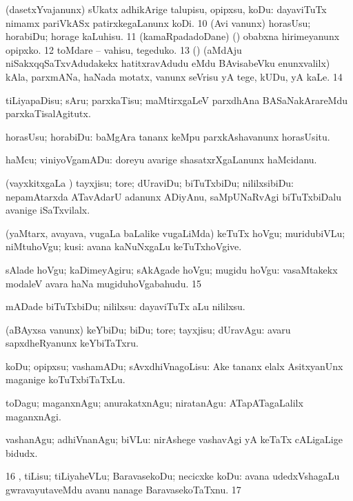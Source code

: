 {{ (dasetxYvajanunx) sUkatx adhikArige talupisu, opipxsu, koDu:  dayaviTuTx nimamx pariVkASx patirxkegaLanunx koDi. 
\num{10}  (Avi \mo vanunx) horasUsu; horabiDu; horage
kaLuhisu. 
\num{11}  (kamaRpadadoDane) (\AmA) obabxna hirimeyanunx opipxko. 
\num{12}  toMdare -- vahisu, tegeduko.
\num{13}  (\AmA) (aMdAju niSakxqqSaTxvAdudakekx
hatitxravAdudu eMdu BAvisabeVku enunxvalilx) kAla, parxmANa, haNada
motatx, \mo vanunx seVrisu yA tege, kUDu, yA kaLe. 
\num{14}  

 tiLiyapaDisu; sAru; parxkaTisu;  maMtirxgaLeV parxdhAna BASaNakArareMdu parxkaTisalAgitutx. 

 horasUsu; horabiDu:  baMgAra tananx
keMpu parxkAshavanunx horasUsitu. 

 haMcu; viniyoVgamADu:  doreyu avarige shasatxrXgaLanunx haMcidanu.

 (vayxkitxgaLa \vi) tayxjisu; tore; dUraviDu; biTuTxbiDu; nililxsibiDu:
 nepamAtarxda
ATavAdarU adanunx ADiyAnu, saMpUNaRvAgi biTuTxbiDalu avanige iSaTxvilalx.

 (yaMtarx, avayava, \mo vugaLa \vi baLalike \mo vugaLiMda) keTuTx
hoVgu; muridubiVLu; niMtuhoVgu; kusi:  avana
kaNuNxgaLu keTuTxhoVgive. 

 sAlade hoVgu; kaDimeyAgiru; sAkAgade hoVgu; mugidu hoVgu:  vasaMtakekx modaleV avara haNa mugiduhoVgabahudu. 
\num{15}  

 mADade biTuTxbiDu; nililxsu:  dayaviTuTx aLu nililxsu. 

 (aBAyxsa \mo vanunx)
keYbiDu; biDu; tore; tayxjisu; dUravAgu: 
avaru sapxdheRyanunx keYbiTaTxru. 

 koDu; opipxsu; vashamADu; sAvxdhiVnagoLisu:  Ake tananx elalx AsitxyanUnx maganige koTuTxbiTaTxLu. 

 toDagu; maganxnAgu;
anurakatxnAgu; niratanAgu:  ATapATagaLalilx maganxnAgi. 

 vashanAgu; adhiVnanAgu; biVLu:  nirAshege vashavAgi yA keTaTx cALigaLige bidudx. 
\num{16} ,  tiLisu; tiLiyaheVLu; BaravasekoDu; necicxke koDu:  avana udedxVshagaLu gwravayutaveMdu avanu nanage BaravasekoTaTxnu.
\num{17}  

}}
